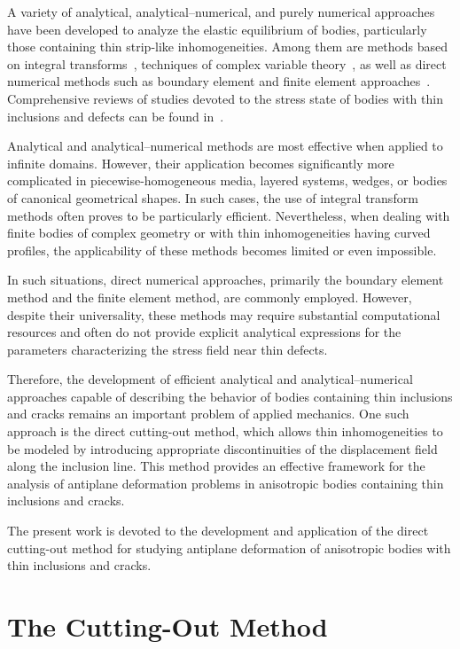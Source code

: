 A variety of analytical, analytical--numerical, and purely numerical approaches have been developed to analyze the elastic equilibrium of bodies, particularly those containing thin strip-like inhomogeneities. Among them are methods based on integral transforms~\cite{Vasilev1,Vasilev4,Vasilev5,Vasilev7,Vasilev12,Vasilev14,Vasilev22,Vasilev23}, techniques of complex variable theory~\cite{Vasilev2,Vasilev8,Vasilev13,Vasilev20}, as well as direct numerical methods such as boundary element and finite element approaches~\cite{Vasilev3,Vasilev15,Vasilev18,Vasilev24}. Comprehensive reviews of studies devoted to the stress state of bodies with thin inclusions and defects can be found in~\cite{Vasilev9,Vasilev10}.

Analytical and analytical--numerical methods are most effective when applied to infinite domains. However, their application becomes significantly more complicated in piecewise-homogeneous media, layered systems, wedges, or bodies of canonical geometrical shapes. In such cases, the use of integral transform methods often proves to be particularly efficient. Nevertheless, when dealing with finite bodies of complex geometry or with thin inhomogeneities having curved profiles, the applicability of these methods becomes limited or even impossible.

In such situations, direct numerical approaches, primarily the boundary element method and the finite element method, are commonly employed. However, despite their universality, these methods may require substantial computational resources and often do not provide explicit analytical expressions for the parameters characterizing the stress field near thin defects.

Therefore, the development of efficient analytical and analytical--numerical approaches capable of describing the behavior of bodies containing thin inclusions and cracks remains an important problem of applied mechanics. One such approach is the direct cutting-out method, which allows thin inhomogeneities to be modeled by introducing appropriate discontinuities of the displacement field along the inclusion line. This method provides an effective framework for the analysis of antiplane deformation problems in anisotropic bodies containing thin inclusions and cracks.

The present work is devoted to the development and application of the direct cutting-out method for studying antiplane deformation of anisotropic bodies with thin inclusions and cracks.

\section{The Cutting-Out Method}

